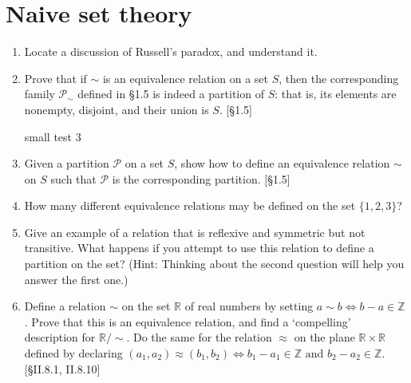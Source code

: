 \section{Naive set theory}
\begin{enumerate}
    \item Locate a discussion of Russell's paradox, and understand it.

    \item Prove that if $\sim$ is an equivalence relation on a set $S$, then the corresponding family $\mathcal{P}_{\sim}$ defined in \S1.5 is indeed a partition of $S$: that is, its elements are nonempty, disjoint, and their union is $S$. [\S1.5]

          \begin{solution}
              \lipsum[1]

              small test 3
          \end{solution}

    \item Given a partition $\mathcal{P}$ on a set $S$, show how to define an equivalence relation $\sim$ on $S$ such that $\mathcal{P}$ is the corresponding partition. [\S1.5]

    \item How many different equivalence relations may be defined on the set $\{1, 2, 3\}$?

    \item Give an example of a relation that is reflexive and symmetric but not transitive. What happens if you attempt to use this relation to define a partition on the set? (Hint: Thinking about the second question will help you answer the first one.)

    \item Define a relation $\sim$ on the set $\mathbb{R}$ of real numbers by setting $a \sim b \iff b-a \in \mathbb{Z}$. Prove that this is an equivalence relation, and find a `compelling' description for $\mathbb{R}/\sim$. Do the same for the relation $\approx$ on the plane $\mathbb{R} \times \mathbb{R}$ defined by declaring $(a_1, a_2) \approx (b_1, b_2) \iff b_1 - a_1 \in \mathbb{Z} \text{ and } b_2 - a_2 \in \mathbb{Z}$. [\S II.8.1, II.8.10]
\end{enumerate}
